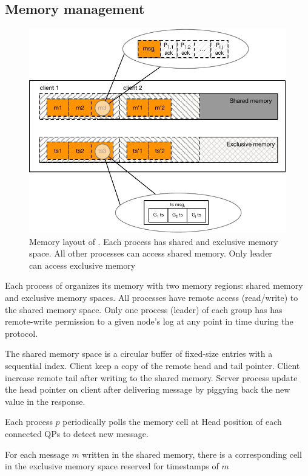 \subsection{Memory management}

\begin{figure}[ht!]
  \centering
  \includegraphics[width=1\linewidth]{figures/memory}
  \caption{Memory layout of \libname. Each process has shared and exclusive memory
  space. All other processes can access shared memory. Only leader can access
  exclusive memory }
  \label{fig:normal_operation_time}
\end{figure}


Each process of \libname organizes its memory with two memory regions: shared
memory and exclusive memory spaces. All processes have remote access
(read/write) to the shared memory space. Only one process (leader) of each group
has has remote-write permission to a given node’s log at any point in time
during the protocol.

The shared memory space is a circular buffer of fixed-size entries with a
sequential index. Client keep a copy of the remote head and tail pointer. Client
increase remote tail after writing to the shared memory. Server process update
the head pointer on client after delivering message by piggying back the new
value in the response.

Each process $p$ periodically polls the memory cell at Head position of each
connected QPs to detect new message.

For each message $m$ written in the shared memory, there is a corresponding cell
in the exclusive memory space reserved for timestamps of $m$


